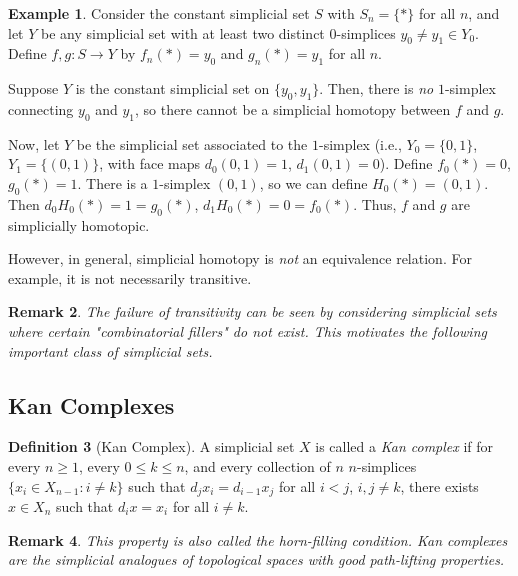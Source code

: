 \documentclass[11pt]{article}
\theoremstyle{definition}
\newtheorem{definition}{Definition}[section]
\newtheorem{example}[definition]{Example}
\theoremstyle{plain}
\newtheorem{remark}[definition]{Remark}
\begin{document}
\begin{example}
    Consider the constant simplicial set $S$ with $S_n = \{\ast\}$ for all $n$, and let $Y$ be any simplicial set with at least two distinct $0$-simplices $y_0 \neq y_1 \in Y_0$. Define $f, g : S \to Y$ by $f_n(\ast) = y_0$ and $g_n(\ast) = y_1$ for all $n$.

    Suppose $Y$ is the constant simplicial set on $\{y_0, y_1\}$. Then, there is \emph{no} $1$-simplex connecting $y_0$ and $y_1$, so there cannot be a simplicial homotopy between $f$ and $g$.

    Now, let $Y$ be the simplicial set associated to the $1$-simplex (i.e., $Y_0 = \{0,1\}$, $Y_1 = \{(0,1)\}$, with face maps $d_0(0,1) = 1$, $d_1(0,1) = 0$). Define $f_0(\ast) = 0$, $g_0(\ast) = 1$. There is a $1$-simplex $(0,1)$, so we can define $H_0(\ast) = (0,1)$. Then $d_0 H_0(\ast) = 1 = g_0(\ast)$, $d_1 H_0(\ast) = 0 = f_0(\ast)$. Thus, $f$ and $g$ are simplicially homotopic.

    However, in general, simplicial homotopy is \emph{not} an equivalence relation. For example, it is not necessarily transitive.
\end{example}

\begin{remark}
    The failure of transitivity can be seen by considering simplicial sets where certain "combinatorial fillers" do not exist. This motivates the following important class of simplicial sets.
\end{remark}

\subsection{Kan Complexes}

\begin{definition}[Kan Complex]
    A simplicial set $X$ is called a \emph{Kan complex} if for every $n \geq 1$, every $0 \leq k \leq n$, and every collection of $n$ $n$-simplices $\{x_i \in X_{n-1} : i \neq k\}$ such that $d_j x_i = d_{i-1} x_j$ for all $i < j$, $i, j \neq k$, there exists $x \in X_n$ such that $d_i x = x_i$ for all $i \neq k$.
\end{definition}

\begin{remark}
    This property is also called the \emph{horn-filling condition}. Kan complexes are the simplicial analogues of topological spaces with good path-lifting properties.
\end{remark}
\end{document}
